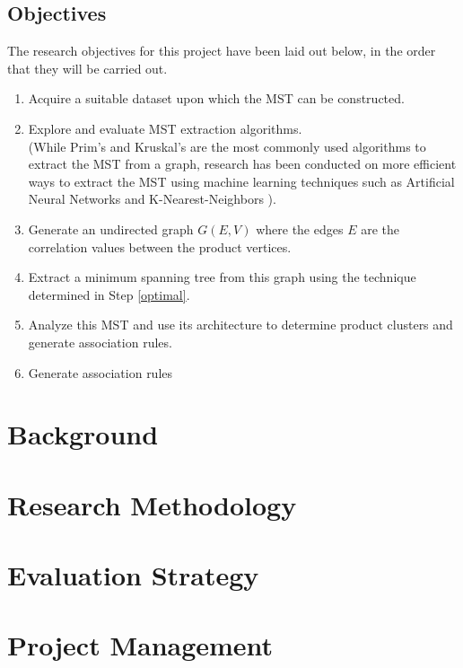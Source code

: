 \documentclass[a4paper,11pt]{article}
\begin{document}
\subsection{Objectives}
The research objectives for this project have been laid out below, in the order that they will be carried out.
\begin{enumerate}
\item Acquire a suitable dataset upon which the MST can be constructed.

\item \label{optimal} Explore and evaluate MST extraction algorithms.
\\(While Prim's \cite{prims}\cite{prims_og} and Kruskal's \cite{kruskal} are the most commonly used algorithms to extract the MST from a graph, research has been conducted on more efficient ways to extract the MST using machine learning techniques such as Artificial Neural Networks \cite{ann_mst} and K-Nearest-Neighbors \cite{knn_mst}).

\item Generate an undirected graph $G(E,V)$ where the edges $E$ are the correlation values between the product vertices.

\item Extract a minimum spanning tree from this graph using the technique determined in Step \ref{optimal}. 

\item Analyze this MST and use its architecture to determine product clusters and generate association rules.

\item Generate association rules 

\end{enumerate}

\section{Background}

\section{Research Methodology}

\section{Evaluation Strategy}

\section{Project Management}


\newpage
\printbibliography
\end{document}
